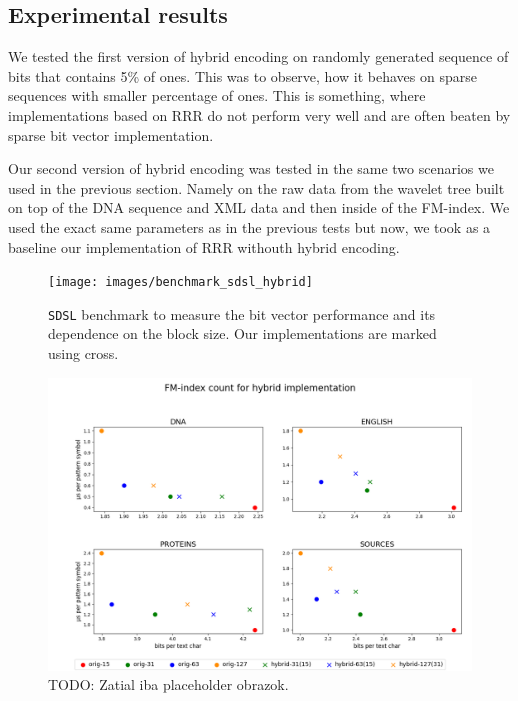 \subsection{Experimental results}


We tested the first version of hybrid encoding on randomly generated sequence of bits that contains 5\% of ones.
This was to observe, how it behaves on sparse sequences with smaller percentage of ones. This is something, where
implementations based on RRR do not perform very well and are often beaten by sparse bit vector implementation.

Our second version of hybrid encoding was tested in the same two scenarios we used in the previous section. Namely
on the raw data from the wavelet tree built on top of the DNA sequence and XML data and then inside of the FM-index.
We used the exact same parameters as in the previous tests but now, we took as a baseline our implementation of RRR
withouth hybrid encoding. 

\begin{figure}
	\centerline{
		\texttt{[image: images/benchmark\_sdsl\_hybrid]}
	}
	\caption[TODO]{\texttt{SDSL} benchmark to measure the bit vector performance and its dependence
	on the block size. Our implementations are marked using cross.
	}
	\label{obr:benchmark_sdsl_hybrid}
\end{figure}

\begin{figure}
	\centerline{
		\includegraphics[width=\textwidth, height=0.4\textheight]{images/vysledky_sdsl_hybrid_count}
	}
	\caption[TODO]{TODO: Zatial iba placeholder obrazok.
	}
	\label{obr:benchmark_sdsl_hybrid_count}
\end{figure}

